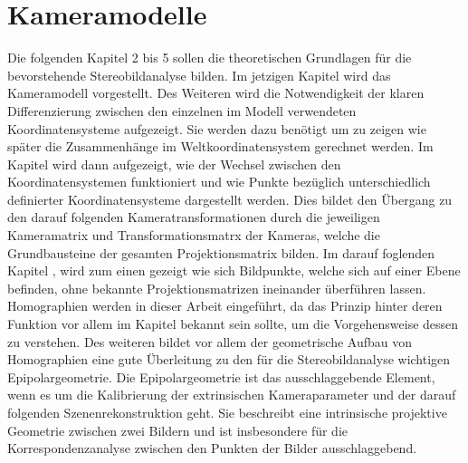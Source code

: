 \chapter{Kameramodelle}
\label{sec:CameraModels}


Die folgenden Kapitel 2 bis 5 sollen die theoretischen Grundlagen für die bevorstehende Stereobildanalyse bilden. Im jetzigen Kapitel wird das Kameramodell vorgestellt. Des Weiteren wird die Notwendigkeit der klaren Differenzierung zwischen den einzelnen im Modell verwendeten Koordinatensysteme aufgezeigt. Sie werden dazu benötigt um zu zeigen wie später die Zusammenhänge im Weltkoordinatensystem gerechnet werden. Im Kapitel  wird dann aufgezeigt, wie der Wechsel zwischen den Koordinatensystemen funktioniert und wie Punkte bezüglich unterschiedlich definierter Koordinatensysteme dargestellt werden. Dies bildet den Übergang zu den darauf folgenden Kameratransformationen durch die jeweiligen Kameramatrix und Transformationsmatrx der Kameras, welche die Grundbausteine der gesamten Projektionsmatrix bilden. Im darauf foglenden Kapitel , wird zum einen gezeigt wie sich Bildpunkte, welche sich auf einer Ebene befinden, ohne bekannte Projektionsmatrizen ineinander überführen lassen. Homographien werden in dieser Arbeit eingeführt, da das Prinzip hinter deren Funktion vor allem im Kapitel  bekannt sein sollte, um die Vorgehensweise dessen zu verstehen. Des weiteren bildet vor allem der geometrische Aufbau von Homographien eine gute Überleitung zu den für die Stereobildanalyse wichtigen Epipolargeometrie. Die Epipolargeometrie ist das ausschlaggebende Element, wenn es um die Kalibrierung der extrinsischen Kameraparameter und der darauf folgenden Szenenrekonstruktion geht. Sie beschreibt eine intrinsische projektive Geometrie zwischen zwei Bildern und ist insbesondere für die Korrespondenzanalyse zwischen den Punkten der Bilder ausschlaggebend.\\

